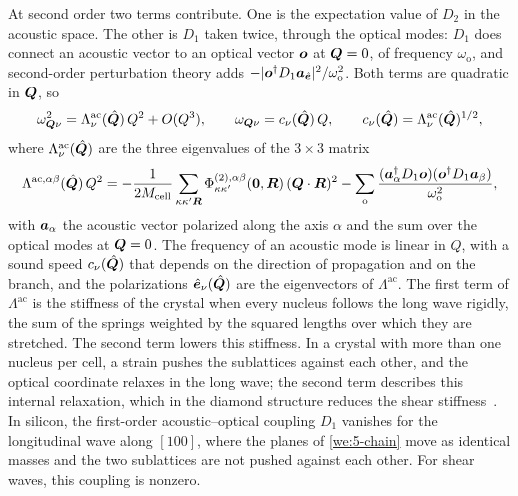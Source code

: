 At second order two terms contribute. One is the expectation value of $D_2$ in the acoustic space. The other is $D_1$ taken twice, through the optical modes: $D_1$ does connect an acoustic vector to an optical vector $\bm{o}$ at $\bm{Q} = 0$, of frequency $\omega_{\mathrm{o}}$, and second-order perturbation theory adds $-|\bm{o}^\dagger D_1\bm{a}_{\hat{\bm{e}}}|^2/\omega_{\mathrm{o}}^2$. Both terms are quadratic in $\bm{Q}$, so
\begin{equation}
  \omega_{\bm{Q}\nu}^2 = \Lambda^{\mathrm{ac}}_\nu(\hat{\bm{Q}})\,Q^2 + O(Q^3), \qquad
  \omega_{\bm{Q}\nu} = c_\nu(\hat{\bm{Q}})\,Q , \qquad c_\nu(\hat{\bm{Q}}) = \Lambda^{\mathrm{ac}}_\nu(\hat{\bm{Q}})^{1/2} ,
  \label{eq:5.2-sound}
\end{equation}
where $\Lambda^{\mathrm{ac}}_\nu(\hat{\bm{Q}})$ are the three eigenvalues of the $3\times3$ matrix
\begin{equation*}
  \Lambda^{\mathrm{ac},\alpha\beta}(\hat{\bm{Q}})\,Q^2 = -\frac{1}{2M_{\mathrm{cell}}}\sum_{\kappa\kappa'\bm{R}}\Phi^{(2),\alpha\beta}_{\kappa\kappa'}(\bm{0},\bm{R})\,(\bm{Q}\cdot\bm{R})^2
  - \sum_{\mathrm{o}}\frac{(\bm{a}_\alpha^\dagger D_1\bm{o})(\bm{o}^\dagger D_1\bm{a}_\beta)}{\omega_{\mathrm{o}}^2} ,
\end{equation*}
with $\bm{a}_\alpha$ the acoustic vector polarized along the axis $\alpha$ and the sum over the optical modes at $\bm{Q} = 0$. The frequency of an acoustic mode is linear in $Q$, with a sound speed $c_\nu(\hat{\bm{Q}})$ that depends on the direction of propagation and on the branch, and the polarizations $\hat{\bm{e}}_\nu(\hat{\bm{Q}})$ are the eigenvectors of $\Lambda^{\mathrm{ac}}$. The first term of $\Lambda^{\mathrm{ac}}$ is the stiffness of the crystal when every nucleus follows the long wave rigidly, the sum of the springs weighted by the squared lengths over which they are stretched. The second term lowers this stiffness. In a crystal with more than one nucleus per cell, a strain pushes the sublattices against each other, and the optical coordinate relaxes in the long wave; the second term describes this internal relaxation, which in the diamond structure reduces the shear stiffness~\cite[Chap.~V]{born1954dynamical}. In silicon, the first-order acoustic--optical coupling $D_1$ vanishes for the longitudinal wave along $[100]$, where the planes of \cref{we:5-chain} move as identical masses and the two sublattices are not pushed against each other. For shear waves, this coupling is nonzero.

